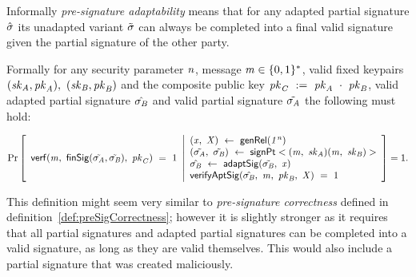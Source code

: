 \begin{definition}
    Informally \textit{pre-signature adaptability} means that for any adapted partial signature $\hat{\sigma}$ its unadapted variant $\tilde{\sigma}$ can always be completed into a final valid signature given the partial signature of the other party.

    Formally for any security parameter $\mathit{n}$, message $\mathit{m} \in \{0,1\}^{*}$, valid fixed keypairs $(\mathit{sk}_{\mathit{A}}, \mathit{pk}_{\mathit{A}}) ,~ (\mathit{sk}_{\mathit{B}}, \mathit{pk}_{\mathit{B}})$ and the composite public key $\mathit{pk}_{\mathit{C}} ~:=~ \mathit{pk}_{\mathit{A}} ~\cdot~ \mathit{pk}_{\mathit{B}}$,
    valid adapted partial signature $\hat{\sigma_{\mathit{B}}}$ and valid partial signature $\tilde{\sigma_{\mathit{A}}}$ the following must hold:

    \[
        \Pr\left[
        \begin{array}{c}
            \mathsf{verf}(\mathit{m} ,~ \mathsf{finSig}(\tilde{\sigma_{\mathit{A}}},\tilde{\sigma_{\mathit{B}}}) ,~ \mathit{pk}_{\mathit{C}}) ~=~ 1
        \end{array}
        \middle\vert
        \begin{array}{l}
            (\mathit{x} ,~ \mathit{X}) ~\leftarrow~ \mathsf{genRel}(\mathit{1^n}) \\
            (\tilde{\sigma_{\mathit{A}}} ,~ \tilde{\sigma_{\mathit{B}}}) ~\leftarrow~ \mathsf{signPt}<(\mathit{m} ,~ \mathit{sk}_{\mathit{A}})(\mathit{m} ,~ \mathit{sk}_{\mathit{B}})> \\
            \hat{\sigma_{\mathit{B}}} ~\leftarrow~ \mathsf{adaptSig}(\tilde{\sigma_{\mathit{B}}} ,~ \mathit{x}) \\
            \mathsf{verifyAptSig}(\hat{\sigma_{\mathit{B}}} ,~ \mathit{m} ,~ \mathit{pk}_{\mathit{B}} ,~ \mathit{X}) ~=~ 1 \\
        \end{array}
        \right]=1.
    \]

    This definition might seem very similar to \textit{pre-signature correctness} defined in definition~\ref{def:preSigCorrectness}; however it is slightly stronger as it requires that all partial signatures and adapted partial signatures can be completed
    into a valid signature, as long as they are valid themselves. This would also include a partial signature that was created maliciously.
\end{definition}

